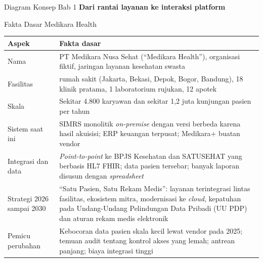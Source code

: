 \documentclass[aspectratio=169, table, 12pt]{beamer}
\begin{document}
\begin{frame}{{\Large Diagram Konsep Bab 1}}
  \centering
  {\small\bfseries Dari rantai layanan ke interaksi platform}\par\medskip
\end{frame}

\begin{frame}{{\Large Fakta Dasar Medikara Health}}
  \scriptsize
  \begin{tabularx}{\textwidth}{>{\raggedright\arraybackslash}p{2.7cm}
      >{\raggedright\arraybackslash}X}
    \hline
    \textbf{Aspek} & \textbf{Fakta dasar} \\ \hline
    Nama & PT Medikara Nusa Sehat (``Medikara Health''), organisasi fiktif, jaringan layanan kesehatan swasta \\ \hline
    Fasilitas & 5 rumah sakit (Jakarta, Bekasi, Depok, Bogor, Bandung), 18 klinik pratama, 1 laboratorium rujukan, 12 apotek \\ \hline
    Skala & Sekitar 4.800 karyawan dan sekitar 1,2 juta kunjungan pasien per tahun \\ \hline
    Sistem saat ini & SIMRS monolitik \textit{on-premise} dengan versi berbeda karena hasil akuisisi; ERP keuangan terpusat; Medikara+ buatan vendor \\ \hline
    Integrasi dan data & \textit{Point-to-point} ke BPJS Kesehatan dan SATUSEHAT yang berbasis HL7 FHIR; data pasien tersebar; banyak laporan disusun dengan \textit{spreadsheet} \\ \hline
    Strategi 2026 sampai 2030 & ``Satu Pasien, Satu Rekam Medis'': layanan terintegrasi lintas fasilitas, ekosistem mitra, modernisasi ke \textit{cloud}, kepatuhan pada Undang-Undang Pelindungan Data Pribadi (UU PDP) dan aturan rekam medis elektronik \\ \hline
    Pemicu perubahan & Kebocoran data pasien skala kecil lewat vendor pada 2025; temuan audit tentang kontrol akses yang lemah; antrean panjang; biaya integrasi tinggi \\ \hline
  \end{tabularx}
\end{frame}
\end{document}
